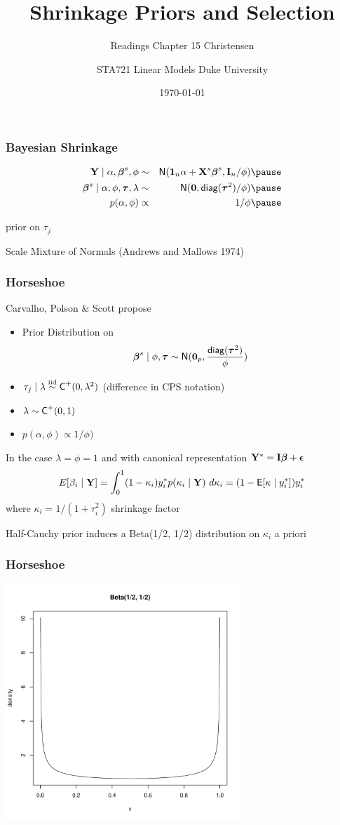 \documentclass[handout]{beamer}
\title{Shrinkage Priors and Selection}
\subtitle{Readings Chapter 15 Christensen}
\institute{Merlise Clyde}
\author{STA721 Linear Models Duke University}
\date{\today}
\begin{document}
\maketitle
\begin{frame}
  \frametitle{Bayesian Shrinkage}
  \begin{eqnarray*}
    \Y \mid \alpha, \b^s, \phi & \sim & \N(\one_n \alpha + \X^s \b^s, \I_n/\phi)  \pause\\
    \b^s \mid \alpha, \phi, \taub, \lambda & \sim & \N(\zero, \diag(\taub^2)/\phi)  \pause\\
    p(\alpha, \phi) & \propto& 1/\phi  \pause\\
  \end{eqnarray*}

prior on $\tau_j$ \pause

Scale Mixture of Normals  (Andrews and Mallows 1974)
\end{frame}




\begin{frame}
  \frametitle{Horseshoe}
  Carvalho, Polson \& Scott  propose
\begin{itemize}
\item
Prior Distribution on $$\boldsymbol{\beta}^s \mid \phi, \boldsymbol{\tau} \sim \textsf{N}(\mathbf{0}_p, \frac{\textsf{diag}(\boldsymbol{\tau}^2)}{ \phi
    }) $$ \pause
\item $\tau_j \mid \lambda \mathrel{\mathop{\sim}\limits^{\rm iid}} \textsf{C}^+(0, \lambda^2)$   (difference in CPS notation) \pause
\item $\lambda \sim \textsf{C}^+(0, 1)$ \pause
\item $p(\alpha, \phi) \propto 1/\phi)$ \pause
\end{itemize}

In the case $\lambda = \phi = 1$ and with canonical representation $\mathbf{Y}^* =
\mathbf{I} \boldsymbol{\beta} + \boldsymbol{\epsilon}$ \pause
$$
E[\beta_i \mid \mathbf{Y}] = \int_0^1 (1 - \kappa_i) y^*_i p(\kappa_i \mid \mathbf{Y})
\ d\kappa_i = (1 - \textsf{E}[\kappa \mid y^*_i]) y^*_i$$
where $\kappa_i = 1/(1 + \tau_i^2)$ shrinkage factor \pause

\vspace{18pt}
Half-Cauchy prior induces a Beta(1/2, 1/2) distribution on $\kappa_i$
a priori
\end{frame}


\begin{frame} \frametitle{Horseshoe}
  \includegraphics[height=3.5in]{beta}
\end{frame}
\end{document}
